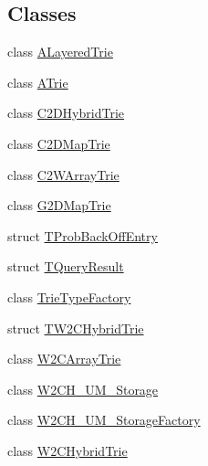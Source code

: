 \subsection*{Classes}
\begin{DoxyCompactItemize}
\item 
class \hyperlink{classuva_1_1smt_1_1tries_1_1_a_layered_trie}{A\+Layered\+Trie}
\item 
class \hyperlink{classuva_1_1smt_1_1tries_1_1_a_trie}{A\+Trie}
\item 
class \hyperlink{classuva_1_1smt_1_1tries_1_1_c2_d_hybrid_trie}{C2\+D\+Hybrid\+Trie}
\item 
class \hyperlink{classuva_1_1smt_1_1tries_1_1_c2_d_map_trie}{C2\+D\+Map\+Trie}
\item 
class \hyperlink{classuva_1_1smt_1_1tries_1_1_c2_w_array_trie}{C2\+W\+Array\+Trie}
\item 
class \hyperlink{classuva_1_1smt_1_1tries_1_1_g2_d_map_trie}{G2\+D\+Map\+Trie}
\item 
struct \hyperlink{structuva_1_1smt_1_1tries_1_1_t_prob_back_off_entry}{T\+Prob\+Back\+Off\+Entry}
\item 
struct \hyperlink{structuva_1_1smt_1_1tries_1_1_t_query_result}{T\+Query\+Result}
\item 
class \hyperlink{classuva_1_1smt_1_1tries_1_1_trie_type_factory}{Trie\+Type\+Factory}
\item 
struct \hyperlink{structuva_1_1smt_1_1tries_1_1_t_w2_c_hybrid_trie}{T\+W2\+C\+Hybrid\+Trie}
\item 
class \hyperlink{classuva_1_1smt_1_1tries_1_1_w2_c_array_trie}{W2\+C\+Array\+Trie}
\item 
class \hyperlink{classuva_1_1smt_1_1tries_1_1_w2_c_h___u_m___storage}{W2\+C\+H\+\_\+\+U\+M\+\_\+\+Storage}
\item 
class \hyperlink{classuva_1_1smt_1_1tries_1_1_w2_c_h___u_m___storage_factory}{W2\+C\+H\+\_\+\+U\+M\+\_\+\+Storage\+Factory}
\item 
class \hyperlink{classuva_1_1smt_1_1tries_1_1_w2_c_hybrid_trie}{W2\+C\+Hybrid\+Trie}
\end{DoxyCompactItemize}
